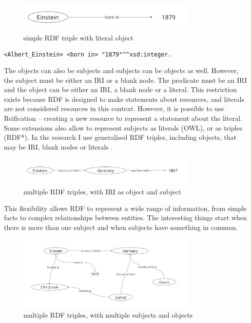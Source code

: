 \begin{figure}[htbp]
    \centering
    \includegraphics[width=0.8\textwidth]{2.png}
    \caption{simple RDF triple with literal object}
    \label{fig:image2}
\end{figure}

{\footnotesize
\begin{verbatim}
<Albert_Einstein> <born in> "1879"^^xsd:integer.
\end{verbatim}
}

The objects can also be subjects and subjects can be objects as well. However, the subject must be either an IRI or a blank node. The predicate must be an IRI and the object can be either an IRI, a blank node or a literal. This restriction exists because RDF is designed to make statements about resources, and literals are not considered resources in this context. However, it is possible to use Reification – creating a new resource to represent a statement about the literal. Some extensions also allow to represent subjects as literals (OWL), or as triples (RDF*). In the research I use generalised RDF triples, including objects, that may be IRI, blank nodes or literals \citep{cyganiak2014rdf}.

\begin{figure}[htbp]
    \centering
    \includegraphics[width=0.8\textwidth]{3.png}
    \caption{multiple RDF triples, with IRI as object and subject}
    \label{fig:image3}
\end{figure}

This flexibility allows RDF to represent a wide range of information, from simple facts to complex relationships between entities. The interesting things start when there is more than one subject and when subjects have something in common.

\begin{figure}[htbp]
    \centering
    \includegraphics[width=0.8\textwidth]{4.png}
    \caption{multiple RDF triples, with multiple subjects and objects}
    \label{fig:image4}
\end{figure}

